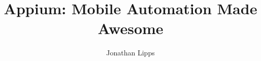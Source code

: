 \documentclass{book}
\begin{document}
\title{Appium: Mobile Automation Made Awesome}
\author{Jonathan Lipps}
\maketitle
\end{document}
